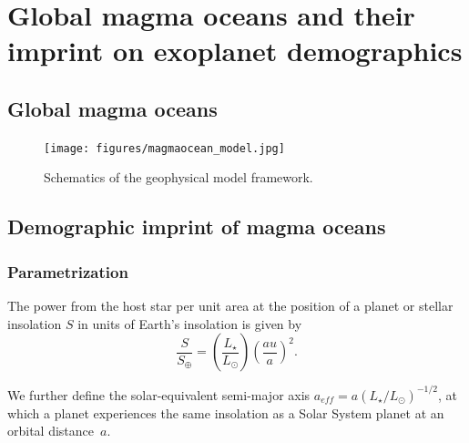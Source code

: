 \documentclass[modern]{aastex631}
\begin{document}
\section{Global magma oceans and their imprint on exoplanet demographics}
\subsection{Global magma oceans}

\begin{figure}[!ht]
    \begin{centering}
        \texttt{[image: figures/magmaocean\_model.jpg]}
        \caption{Schematics of the geophysical model framework.}
        \label{fig:magmaocean_model}
    \end{centering}
\end{figure}


\subsection{Demographic imprint of magma oceans}

\subsubsection{Parametrization}
\label{sec:mo_model}



\begin{note}
    The power from the host star per unit area at the position of a planet or stellar insolation $S$ in units of Earth's insolation is given by
    \begin{equation}
        \frac{S}{S_\oplus} = \left(\frac{L_\star}{L_\odot}\right) \left(\frac{au}{a}\right)^2 .
    \end{equation}

    We further define the solar-equivalent semi-major axis $a_{eff} = a (L_\star/L_\odot)^{-1/2}$, at which a planet experiences the same insolation as a Solar System planet at an orbital distance~$a$.
\end{note}
\end{document}

